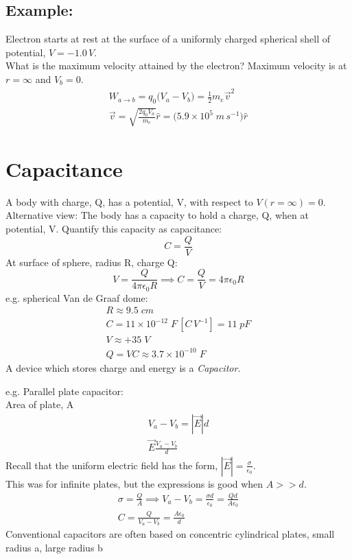 \documentclass[a4paper, 11pt, fleqn, normalem]{report}
\begin{document}
\subsection{Example:}
Electron starts at rest at the surface of a uniformly charged spherical shell of potential, $V = -1.0\,V$. \\
What is the maximum velocity attained by the electron?
Maximum velocity is at $r = \infty$ and $V_{b} = 0$.
\begin{gather*}
    W_{a \to b} = q_{0} \big(V_{a} - V_{b} \big) = \tfrac{1}{2}m_{e}\vec{v}^{2} \\
    \vec{v} = \sqrt{\frac{2q_{0}V_{a}}{m_{e}}} \hat{r} = \big(5.9 \times 10^{5} \; m\,s^{-1} \big) \hat{r}
\end{gather*}

\section{Capacitance}
A body with charge, Q, has a potential, V, with respect to $V(r = \infty) = 0$. \\
Alternative view: The body has a capacity to hold a charge, Q, when at potential, V. Quantify this capacity as capacitance:
\begin{equation*}
    C = \frac{Q}{V}
\end{equation*}
At surface of sphere, radius R, charge Q:
\begin{equation*}
    V = \frac{Q}{4\pi\epsilon_{0} R} \implies C = \frac{Q}{V} = 4\pi\epsilon_{0}R
\end{equation*}
e.g. spherical Van de Graaf dome:
\begin{gather*}
    R \approx 9.5 \; cm \\
    C = 11 \times 10^{-12} \; F\,[C\,V^{-1}] = 11 \; pF \\
    V \approx + 35\;V \\
    Q = VC \approx 3.7 \times 10^{-10} \; F
\end{gather*}
A device which stores charge and energy is a \emph{Capacitor}.

e.g. Parallel plate capacitor: \\
Area of plate, A
\begin{gather*}
    V_{a} - V_{b} = |\vec{E}|d \\
    \vec{E} \frac{V_{a} - V_{b}}{d}
\end{gather*}
Recall that the uniform electric field has the form, $|\vec{E}| = \frac{\sigma}{\epsilon_{0}}$. \\
This was for infinite plates, but the expressions is good when $A >> d$.
\begin{gather*}
    \sigma = \frac{Q}{A} \implies V_{a} - V_{b} = \frac{\sigma d}{\epsilon_{0}} = \frac{Q d}{A \epsilon_{0}} \\
    C = \frac{Q}{V_{a} - V_{b}} = \frac{A \epsilon_{0}}{d}
\end{gather*}
Conventional capacitors are often based on concentric cylindrical plates, small radius a, large radius b
\end{document}
